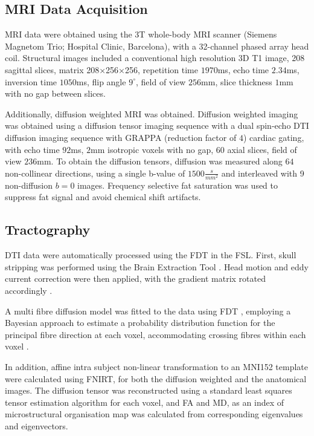 \subsection{MRI Data Acquisition}
\ac{MRI} data were obtained using the 3T whole-body MRI scanner (Siemens Magnetom Trio; Hospital Clinic, Barcelona), with a 32-channel phased array head coil. Structural images included a conventional high resolution 3D T1 image, 208 sagittal slices, matrix 208×256×256, repetition time $1970$ms, echo time $2.34$ms, inversion time $1050$ms, flip angle $9^{\circ}$, field of view $256$mm, slice thickness $1$mm with no gap between slices.\par
Additionally, diffusion weighted \ac{MRI} was obtained. Diffusion weighted imaging was obtained using a diffusion tensor imaging sequence with a dual spin-echo \ac{DTI} diffusion imaging sequence with GRAPPA (reduction factor of $4$) cardiac gating, with echo time $92$ms, $2$mm isotropic voxels with no gap, $60$ axial slices, field of view $236$mm. To obtain the diffusion tensors, diffusion was measured along $64$ non-collinear directions, using a single b-value of $1500\frac{s}{mm^2}$ and interleaved with 9 non-diffusion $b=0$ images. Frequency selective fat saturation was used to suppress fat signal and avoid chemical shift artifacts.

\subsection{Tractography}
\ac{DTI} data were automatically processed using the \ac{FDT} in the \ac{FSL}. First, skull stripping was performed using the Brain Extraction Tool \cite{bet}. Head motion and eddy current correction were then applied, with the gradient matrix rotated accordingly \cite{eddy}.\par
A multi fibre diffusion model was fitted to the data using \ac{FDT} \cite{tract}, employing a Bayesian approach to estimate a probability distribution function for the principal fibre direction at each voxel, accommodating crossing fibres within each voxel \cite{tract2}.\par
In addition, affine intra subject non-linear transformation to an MNI152 template were calculated using \ac{FNIRT}, for both the diffusion weighted and the anatomical images. The diffusion tensor was reconstructed using a standard least squares tensor estimation algorithm for each voxel, and \ac{FA} and \ac{MD}, as an index of microstructural organisation map was calculated from corresponding eigenvalues and eigenvectors.

